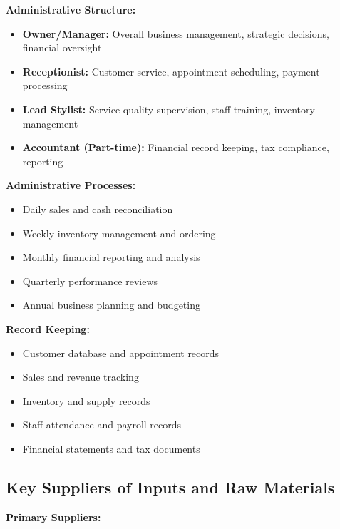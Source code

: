 \documentclass[a4paper,12pt]{article}
\begin{document}
\textbf{Administrative Structure:}
\begin{itemize}[leftmargin=2em]
    \item \textbf{Owner/Manager:} Overall business management, strategic decisions, financial oversight
    \item \textbf{Receptionist:} Customer service, appointment scheduling, payment processing
    \item \textbf{Lead Stylist:} Service quality supervision, staff training, inventory management
    \item \textbf{Accountant (Part-time):} Financial record keeping, tax compliance, reporting
\end{itemize}

\textbf{Administrative Processes:}
\begin{itemize}[leftmargin=2em]
    \item Daily sales and cash reconciliation
    \item Weekly inventory management and ordering
    \item Monthly financial reporting and analysis
    \item Quarterly performance reviews
    \item Annual business planning and budgeting
\end{itemize}

\textbf{Record Keeping:}
\begin{itemize}[leftmargin=2em]
    \item Customer database and appointment records
    \item Sales and revenue tracking
    \item Inventory and supply records
    \item Staff attendance and payroll records
    \item Financial statements and tax documents
\end{itemize}

\subsection{Key Suppliers of Inputs and Raw Materials}

\textbf{Primary Suppliers:}
\end{document}
